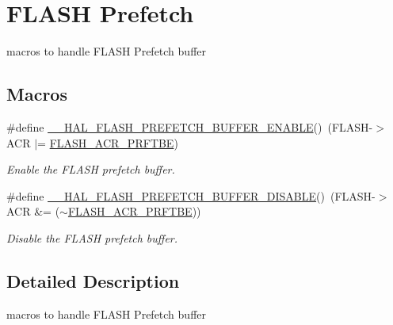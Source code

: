 \hypertarget{group___f_l_a_s_h___prefetch}{}\section{F\+L\+A\+SH Prefetch}
\label{group___f_l_a_s_h___prefetch}


macros to handle F\+L\+A\+SH Prefetch buffer  


\subsection*{Macros}
\begin{DoxyCompactItemize}
\item 
\#define \hyperlink{group___f_l_a_s_h___prefetch_gad36059641057f824516303ea92734e6f}{\+\_\+\+\_\+\+H\+A\+L\+\_\+\+F\+L\+A\+S\+H\+\_\+\+P\+R\+E\+F\+E\+T\+C\+H\+\_\+\+B\+U\+F\+F\+E\+R\+\_\+\+E\+N\+A\+B\+LE}()~(F\+L\+A\+SH-\/$>$A\+CR $\vert$= \hyperlink{group___peripheral___registers___bits___definition_ga5285ab198307213dce0629f9b7c6fc86}{F\+L\+A\+S\+H\+\_\+\+A\+C\+R\+\_\+\+P\+R\+F\+T\+BE})
\begin{DoxyCompactList}\small\item\em Enable the F\+L\+A\+SH prefetch buffer. \end{DoxyCompactList}\item 
\#define \hyperlink{group___f_l_a_s_h___prefetch_ga646a4cb92e85659334d14a8c78f0ede8}{\+\_\+\+\_\+\+H\+A\+L\+\_\+\+F\+L\+A\+S\+H\+\_\+\+P\+R\+E\+F\+E\+T\+C\+H\+\_\+\+B\+U\+F\+F\+E\+R\+\_\+\+D\+I\+S\+A\+B\+LE}()~(F\+L\+A\+SH-\/$>$A\+CR \&= ($\sim$\hyperlink{group___peripheral___registers___bits___definition_ga5285ab198307213dce0629f9b7c6fc86}{F\+L\+A\+S\+H\+\_\+\+A\+C\+R\+\_\+\+P\+R\+F\+T\+BE}))
\begin{DoxyCompactList}\small\item\em Disable the F\+L\+A\+SH prefetch buffer. \end{DoxyCompactList}\end{DoxyCompactItemize}


\subsection{Detailed Description}
macros to handle F\+L\+A\+SH Prefetch buffer 



